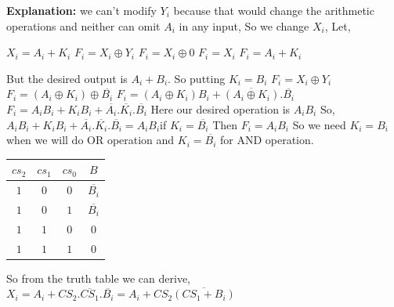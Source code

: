 \documentclass[]{article}
\begin{document}
	\textbf{Explanation:}\newline
	we can't modify $Y_i$ because that would change the arithmetic operations
	and neither can omit $A_i$ in any input, So we change $X_i$,\newline
	Let,

	$X_i=A_i+K_i$ \newline
	$F_i=X_i \oplus Y_i$ \newline
	$F_i=X_i \oplus 0$ \newline
	$F_i=X_i$ \newline
	$F_i=A_i+K_i$\newline
	
	But the desired output is $A_i+B_i$. So putting $K_i=B_i$ \newline
	$F_i=X_i \oplus Y_i$\newline
	$F_i=(A_i \oplus K_i) \oplus \overline{B_i}$\newline
	$F_i=(A_i \oplus K_i)B_i + \overline{(A_i \oplus K_i)} .\overline{B_i}$\newline
	$F_i=A_iB_i + K_iB_i + \overline{A_i}.\overline{K_i}.\overline{B_i}$ \newline Here our desired operation is $A_iB_i$ \newline
	So, $A_iB_i + K_iB_i + \overline{A_i}.\overline{K_i}.\overline{B_i} = A_iB_i$\newline if $K_i=\overline{B_i}$	Then $F_i=A_iB_i$\newline
	So we need $K_i=B_i$ when we will do OR operation and $K_i=\overline{B_i}$ for AND operation.
	
	\begin{center}
		\begin{tabular}{|c|c|c|c|}
			\hline
			$cs_2$ & $cs_1$ & $cs_0$ & $B$ \\
			\hline
			
			\hline
			$1$ & $0$ & $0$ & $\overline{B_i}$ \\
			\hline
			
			\hline
			$1$ & $0$ & $1$ & $\overline{B_i}$ \\
			\hline
			
			\hline
			$1$ & $1$ & $0$ & $0$ \\
			\hline
			
			\hline
			$1$ & $1$ & $1$ & $0$ \\
			\hline
		\end{tabular}
	\end{center}
	So from the truth table we can derive, \newline
	$X_i=A_i+CS_2.\overline{CS_1}.\overline{B_i}=A_i+CS_2\overline{(CS_1+B_i)} $\newline
	
\end{document}
